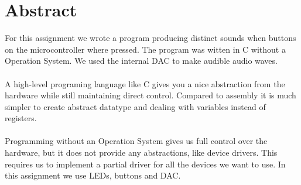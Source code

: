 \section{Abstract}
For this assignment we wrote a program producing distinct sounds when buttons on the microcontroller
where pressed. The program was witten in C without a Operation System. We used the internal DAC to
make audible audio waves.\\
\\
A high-level programing language like C gives you a nice abstraction from the hardware while still
maintaining direct control. Compared to assembly it is much simpler to create abstract datatype and
dealing with variables instead of registers.\\
\\
Programming without an Operation System gives us full control over the hardware, but it does not
provide any abstractions, like device drivers. This requires us to implement a partial driver for
all the devices we want to use. In this assignment we use LEDs, buttons and DAC.
